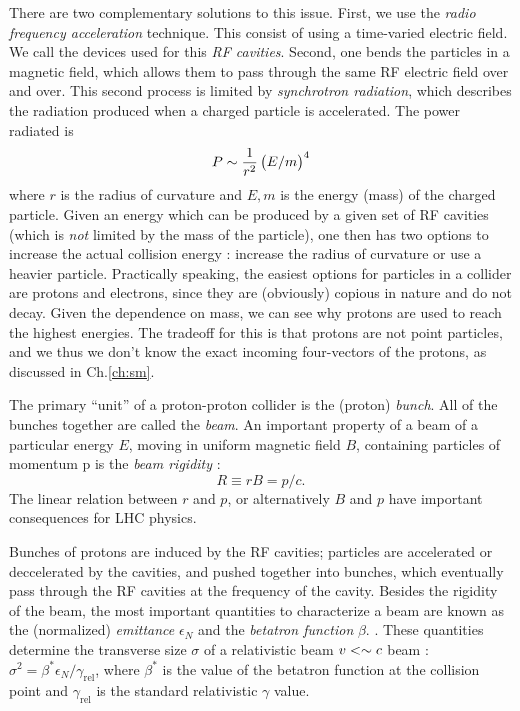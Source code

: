 There are two complementary solutions to this issue.
First, we use the \textit{radio frequency acceleration} technique.
This consist of using a time-varied electric field.
We call the devices used for this \textit{RF cavities}.
Second, one bends the particles in a magnetic field, which allows them to pass through the same RF electric field over and over.
This second process is limited by \textit{synchrotron radiation}, which describes the radiation produced when a charged particle is accelerated.
The power radiated is
\begin{equation}
P \sim \frac{1}{r^2} \begin{pmatrix} E/m \end{pmatrix}^4
\end{equation}
where $r$ is the radius of curvature and $E,m$ is the energy (mass) of the charged particle.
Given an energy which can be produced by a given set of RF cavities (which is \textit{not} limited by the mass of the particle), one then has two options to increase the actual collision energy : increase the radius of curvature or use a heavier particle.
Practically speaking, the easiest options for particles in a collider are protons and electrons, since they are (obviously) copious in nature and do not decay\footnotemark.
Given the dependence on mass, we can see why protons are used to reach the highest energies.
The tradeoff for this is that protons are not point particles, and we thus we don't know the exact incoming four-vectors of the protons, as discussed in Ch.\ref{ch:sm}.

The primary ``unit'' of a proton-proton collider is the (proton) \textit{bunch}.
All of the bunches together are called the \textit{beam}.
An important property of a beam of a particular energy $E$, moving in uniform magnetic field $B$, containing particles of momentum p is the \textit{beam rigidity} :
\begin{equation}\label{eq:rigidity}
R \equiv r B = p / c.
\end{equation}
The linear relation between $r$ and $p$, or alternatively $B$ and $p$ have important consequences for LHC physics.

Bunches of protons are induced by the RF cavities; particles are accelerated or deccelerated by the cavities, and pushed together into bunches, which eventually pass through the RF cavities at the frequency of the cavity.
Besides the rigidity of the beam, the most important quantities to characterize a beam are known as the (normalized) \textit{emittance} $\epsilon_N$ and the \textit{betatron function} $\beta$. .
These quantities determine the transverse size $\sigma$ of a relativistic beam $v <\sim c$ beam : $\sigma^2 = \beta^* \epsilon_N / \gamma_{\text{rel}}$, where $\beta^*$ is the value of the betatron function at the collision point and $\gamma_{\text{rel}}$ is the standard relativistic $\gamma$ value.

